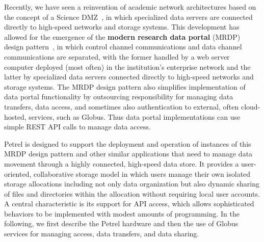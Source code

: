 \documentclass[sigconf]{acmart}
\begin{document}
Recently, we have seen a reinvention of academic network architectures based on the 
concept of a Science DMZ~\cite{dart2014science}, 
in which specialized data servers are connected directly to
high-speed networks and storage systems.  
This development has allowed for the emergence of the \textbf{modern research data portal} (MRDP) design pattern~\cite{BMRDP},
in which 
control channel communications and data channel communications are separated,
with the former handled by a web server computer deployed (most often) in the institution's enterprise network
and the latter by specialized data servers connected directly to high-speed networks
and storage systems.
The MRDP design pattern also simplifies implementation of data portal functionality by outsourcing
responsibility for managing data transfers, data access, and sometimes also authentication
to external, often cloud-hosted, services, such as Globus.
Thus data portal implementations can use simple REST API calls to manage data access.

Petrel is designed to support the deployment
and operation of instances of this MRDP design pattern and other similar applications that need to
manage data movement through
a highly connected, high-speed data store.
It provides a user-oriented, collaborative storage model in which
users manage their own isolated storage allocations including not
only data organization but also dynamic sharing of files and directories
within the allocation without requiring local user accounts.
A central characteristic is its support for API access, which allows
sophisticated behaviors to be implemented with modest amounts of programming.
In the following, we first describe the Petrel hardware and then the use of Globus services   
for managing access, data transfers, and data sharing.
\end{document}
